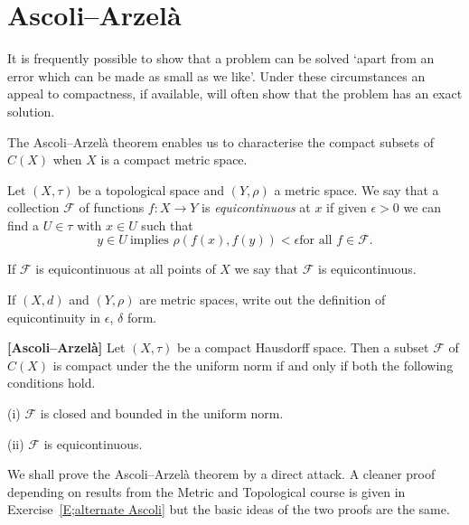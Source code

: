 \section{Ascoli--Arzel{\`a}}
It is frequently possible to show that a problem can be solved
`apart from an error which can be made as small as we like'.
Under these circumstances an appeal to compactness,
if available, will often show that the problem has an exact solution.

The Ascoli--Arzel{\`a} theorem enables us to characterise
the compact subsets of $C(X)$ when $X$ is a 
compact metric space.
\begin{definition} Let $(X,\tau)$ be a topological space
and $(Y,\rho)$ a metric space. We say that
a collection ${\mathcal F}$ of functions $f:X\rightarrow Y$
is \emph{equicontinuous} at $x$ if given $\epsilon>0$
we can find a $U\in\tau$ with $x\in U$ such that
\[y\in U
\ \text{implies $\rho(f(x),f(y))<\epsilon$
for all $f\in{\mathcal F}$}.\]

If  ${\mathcal F}$
is equicontinuous at all points of $X$ we say that
${\mathcal F}$ is equicontinuous.
\end{definition}
\begin{exercise} If $(X,d)$ and $(Y,\rho)$ are metric spaces,
write out the definition of equicontinuity in $\epsilon$,
$\delta$ form.
\end{exercise}
\begin{theorem}{\bf [Ascoli--Arzel{\`a}]}\label{T;Ascoli}
Let $(X,\tau)$ be a compact Hausdorff space.
Then a subset ${\mathcal F}$ of $C(X)$ is compact
under the the uniform norm if and only if
both the following conditions hold.

(i) ${\mathcal F}$ is closed and bounded in the uniform norm.

(ii) ${\mathcal F}$ is equicontinuous.
\end{theorem}
We shall prove the Ascoli--Arzel{\`a} theorem by a
direct attack. A cleaner proof depending on results
from the Metric and Topological course is given in
Exercise~\ref{E;alternate Ascoli} but the basic ideas
of the two proofs are the same.  

